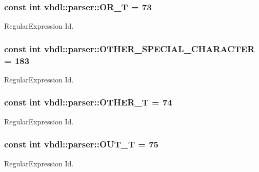 \subsubsection[{O\+R\+\_\+\+T}]{\setlength{\rightskip}{0pt plus 5cm}const int vhdl\+::parser\+::\+O\+R\+\_\+\+T = 73}\label{namespacevhdl_1_1parser_ade02696fa8fd8af1856742d97bda56cd}
Regular\+Expression Id. \hypertarget{namespacevhdl_1_1parser_a4c391e615a73f773284ff193be2e7d19}{}
\subsubsection[{O\+T\+H\+E\+R\+\_\+\+S\+P\+E\+C\+I\+A\+L\+\_\+\+C\+H\+A\+R\+A\+C\+T\+E\+R}]{\setlength{\rightskip}{0pt plus 5cm}const int vhdl\+::parser\+::\+O\+T\+H\+E\+R\+\_\+\+S\+P\+E\+C\+I\+A\+L\+\_\+\+C\+H\+A\+R\+A\+C\+T\+E\+R = 183}\label{namespacevhdl_1_1parser_a4c391e615a73f773284ff193be2e7d19}
Regular\+Expression Id. \hypertarget{namespacevhdl_1_1parser_ab48ce077c3fbf34264d4231379e41f2d}{}
\subsubsection[{O\+T\+H\+E\+R\+\_\+\+T}]{\setlength{\rightskip}{0pt plus 5cm}const int vhdl\+::parser\+::\+O\+T\+H\+E\+R\+\_\+\+T = 74}\label{namespacevhdl_1_1parser_ab48ce077c3fbf34264d4231379e41f2d}
Regular\+Expression Id. \hypertarget{namespacevhdl_1_1parser_a5cebc310a12681a2f65a104ed6672a93}{}
\subsubsection[{O\+U\+T\+\_\+\+T}]{\setlength{\rightskip}{0pt plus 5cm}const int vhdl\+::parser\+::\+O\+U\+T\+\_\+\+T = 75}\label{namespacevhdl_1_1parser_a5cebc310a12681a2f65a104ed6672a93}
Regular\+Expression Id. \hypertarget{namespacevhdl_1_1parser_a913d1328c0f77f429ffaf516fb9b645d}{}
